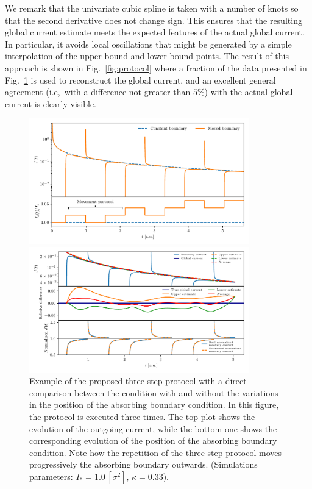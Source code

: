 We remark that the univariate cubic spline is taken with a number of knots so that the second derivative does not change sign. This ensures that the resulting global current estimate meets the expected features of the actual global current. In particular, it avoids local oscillations that might be generated by a simple interpolation of the upper-bound and lower-bound points. The result of this approach is shown in Fig.~\ref{fig:protocol} where a fraction of the data presented in Fig.~\ref{fig:9} is used to reconstruct the global current, and an excellent general agreement (i.e,\ with a difference not greater than $5\%$) with the actual global current is clearly visible.
%
\begin{figure}[p]
    \centering
    \includegraphics[trim={0 3mm 0 3mm},clip,width=0.85\textwidth]{4_probing_the_diffusive_behavior/figs/final/the_protocol.pdf}
    \caption{Example of the proposed three-step protocol with a direct comparison between the condition with and without the variations in the position of the absorbing boundary condition. In this figure, the protocol is executed three times. The top plot shows the evolution of the outgoing current, while the bottom one shows the corresponding evolution of the position of the absorbing boundary condition. Note how the repetition of the three-step protocol moves progressively the absorbing boundary outwards. (Simulations parameters: $I_\ast = 1.0\,[\sigma^2],\,\kappa = 0.33$).}
    \label{fig:9}
%
    \vspace{1mm}
    \includegraphics[trim={0 3mm 0 3mm},clip,width=0.85\textwidth]{4_probing_the_diffusive_behavior/figs/final/the_interpolation.pdf}

\end{figure}
